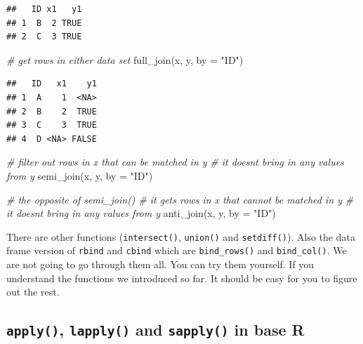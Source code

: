 \documentclass[
  12pt,
]{krantz}
\makeatletter
\newenvironment{Shaded}{\begin{snugshade}}{\end{snugshade}}
\newcommand{\AttributeTok}[1]{\textcolor[rgb]{0.61,0.61,0.61}{#1}}
\newcommand{\CommentTok}[1]{\textcolor[rgb]{0.37,0.37,0.37}{\textit{#1}}}
\newcommand{\FunctionTok}[1]{\textcolor[rgb]{0,0,0}{#1}}
\newcommand{\NormalTok}[1]{#1}
\newcommand{\StringTok}[1]{\textcolor[rgb]{0.5,0.5,0.5}{#1}}
\newenvironment{kframe}{%
\medskip{}
\setlength{\fboxsep}{.8em}
 \def\at@end@of@kframe{}%
 \ifinner\ifhmode%
  \def\at@end@of@kframe{\end{minipage}}%
  \begin{minipage}{\columnwidth}%
 \fi\fi%
 \def\FrameCommand##1{\hskip\@totalleftmargin \hskip-\fboxsep
 \colorbox{shadecolor}{##1}\hskip-\fboxsep
     \hskip-\linewidth \hskip-\@totalleftmargin \hskip\columnwidth}%
 \MakeFramed {\advance\hsize-\width
   \@totalleftmargin\z@ \linewidth\hsize
   \@setminipage}}%
 {\par\unskip\endMakeFramed%
 \at@end@of@kframe}
\renewenvironment{Shaded}{\begin{kframe}}{\end{kframe}}
\makeatother
\begin{document}
\begin{verbatim}
##   ID x1   y1
## 1  B  2 TRUE
## 2  C  3 TRUE
\end{verbatim}

\begin{Shaded}
\begin{Highlighting}[]
\CommentTok{\# get rows in either data set}
\FunctionTok{full\_join}\NormalTok{(x, y, }\AttributeTok{by =} \StringTok{"ID"}\NormalTok{)}
\end{Highlighting}
\end{Shaded}

\begin{verbatim}
##   ID   x1    y1
## 1  A    1  <NA>
## 2  B    2  TRUE
## 3  C    3  TRUE
## 4  D <NA> FALSE
\end{verbatim}

\begin{Shaded}
\begin{Highlighting}[]
\CommentTok{\# filter out rows in x that can be matched in y }
\CommentTok{\# it doesn\textquotesingle{}t bring in any values from y }
\FunctionTok{semi\_join}\NormalTok{(x, y, }\AttributeTok{by =} \StringTok{"ID"}\NormalTok{)}
\end{Highlighting}
\end{Shaded}

\begin{Shaded}
\begin{Highlighting}[]
\CommentTok{\# the opposite of  semi\_join()}
\CommentTok{\# it gets rows in x that cannot be matched in y}
\CommentTok{\# it doesn\textquotesingle{}t bring in any values from y}
\FunctionTok{anti\_join}\NormalTok{(x, y, }\AttributeTok{by =} \StringTok{"ID"}\NormalTok{)}
\end{Highlighting}
\end{Shaded}

There are other functions (\texttt{intersect()}, \texttt{union()} and \texttt{setdiff()}). Also the data frame version of \texttt{rbind} and \texttt{cbind} which are \texttt{bind\_rows()} and \texttt{bind\_col()}. We are not going to go through them all. You can try them yourself. If you understand the functions we introduced so far. It should be easy for you to figure out the rest.

\hypertarget{applyfamilyinbaser}{%
\subsection{\texorpdfstring{\texttt{apply()}, \texttt{lapply()} and \texttt{sapply()} in base R}{apply(), lapply() and sapply() in base R}}\label{applyfamilyinbaser}}
\end{document}
